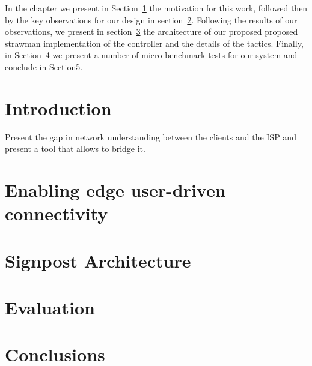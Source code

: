 In the chapter we present in Section~\ref{sec:signpost-introduction} the
motivation for this work, followed then by the key observations for our design
in section~\ref{sec:signpost-design}. Following the results of our
observations, we present in section~\ref{sec:signpost-architecture} the
architecture of our proposed proposed strawman implementation of the controller
and the details of the tactics. Finally, in Section~\ref{sec:signpost-evaluation}
we present a number of micro-benchmark tests for our system and conclude in
Section\ref{sec:signpost-conclusion}.

\section{Introduction}\label{sec:signpost-introduction}

Present the gap in network understanding between the clients and the ISP and
present a tool that allows to bridge it.

\section{Enabling edge user-driven connectivity}\label{sec:signpost-design}

\section{Signpost Architecture}\label{sec:signpost-architecture}

\section{Evaluation}\label{sec:signpost-evaluation}

\section{Conclusions}\label{sec:signpost-conclusion}
%
%
%


